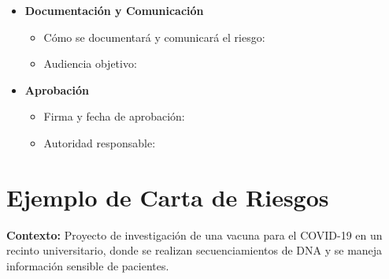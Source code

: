 \begin{itemize}
\begin{itemize}
    \end{itemize}
  \item \textbf{Documentación y Comunicación}
    \begin{itemize}
      \item Cómo se documentará y comunicará el riesgo:
      \item Audiencia objetivo:
    \end{itemize}
  \item \textbf{Aprobación}
    \begin{itemize}
      \item Firma y fecha de aprobación:
      \item Autoridad responsable:
    \end{itemize}
\end{itemize}

\section{Ejemplo de Carta de Riesgos}

\textbf{Contexto:} Proyecto de investigación de una vacuna para el COVID-19 en un recinto universitario, donde se realizan secuenciamientos de DNA y se maneja información sensible de pacientes.

